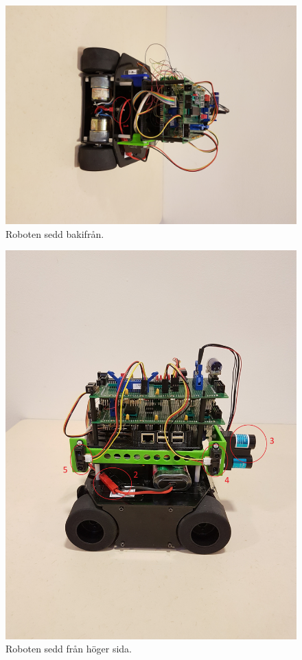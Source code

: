 \documentclass{article}
\begin{document}
\clearpage
\begin{figure}[H]
\centering
\includegraphics[scale=0.1]{robot_back}
\caption{Roboten sedd bakifrån.}
\label{fig:robot_back}
\end{figure}

\begin{figure}[H]
\centering
\includegraphics[scale=0.1]{robot_right_side}
\caption{Roboten sedd från höger sida.}
\label{fig:robot_right_side}
\end{figure}
\end{document}
